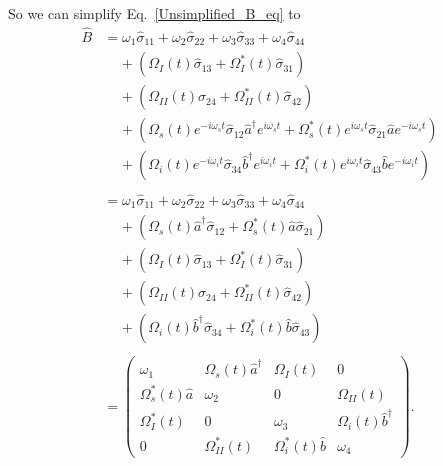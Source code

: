 \documentclass[aps,pra,showpacs,amsmath,amssymb,nofootinbib,longbibliography,superscriptaddress
]{revtex4-1}
\theoremstyle{definition}
\theoremstyle{remark}
\newcommand{\0}{\hat{0}}
\begin{document}
So we can simplify Eq.~\eqref{Unsimplified_B_eq} to
\begin{align}
    \hat{B}
    &=
    \omega_1 \hat{\sigma}_{11} + \omega_2 \hat{\sigma}_{22} + \omega_3 \hat{\sigma}_{33} + \omega_4 \hat{\sigma}_{44} \nonumber \\
    &\;\;\;\;+
    \left(
        \Omega_{I}(t) \hat{\sigma}_{13} +
        \Omega_{I}^*(t) \hat{\sigma}_{31}
    \right)\nonumber \\
    &\;\;\;\;+
    \left(
        \Omega_{II}(t) \hat{\sigma}_{24} +
        \Omega_{II}^*(t) \hat{\sigma}_{42}
    \right) \nonumber \\
    &\;\;\;\;+
    \left(
        \Omega_{s}(t) e^{-i \omega_s t} \hat{\sigma}_{12} \hat{a}^{\dagger} e^{i \omega_s t} +
        \Omega_{s}^*(t) e^{i \omega_s t} \hat{\sigma}_{21} \hat{a} e^{-i \omega_s t}
    \right) \nonumber \\
    &\;\;\;\;+
    \left(
        \Omega_{i}(t) e^{-i\omega_i t} \hat{\sigma}_{34} \hat{b}^{\dagger} e^{i \omega_i t}
        + \Omega_{i}^*(t) e^{i\omega_i t} \hat{\sigma}_{43} \hat{b} e^{-i \omega_i t}
    \right)\nonumber \\ \nonumber \\ 
    &=
    \omega_1 \hat{\sigma}_{11} + \omega_2 \hat{\sigma}_{22} + \omega_3 \hat{\sigma}_{33} + \omega_4 \hat{\sigma}_{44} \nonumber \\
    &\;\;\;\;+
    \left(
        \Omega_{s}(t) \hat{a}^{\dagger} \hat{\sigma}_{12} +
        \Omega_{s}^*(t) \hat{a} \hat{\sigma}_{21}
    \right) \nonumber \\
    &\;\;\;\;+
    \left(
        \Omega_{I}(t) \hat{\sigma}_{13} +
        \Omega_{I}^*(t) \hat{\sigma}_{31}
    \right)\nonumber \\
    &\;\;\;\;+
    \left(
        \Omega_{II}(t) \hat{\sigma}_{24} +
        \Omega_{II}^*(t) \hat{\sigma}_{42}
    \right)\nonumber \\
    &\;\;\;\;+
    \left(
        \Omega_{i}(t) \hat{b}^{\dagger} \hat{\sigma}_{34} +
        \Omega_{i}^*(t) \hat{b} \hat{\sigma}_{43}
    \right) \nonumber \\ \nonumber \\ 
    &= \left(\begin{array}{cccc}
        \omega_1  & \Omega_{s}(t) \hat{a}^{\dagger} & \Omega_{I}(t) & 0\\
        \Omega_{s}^*(t) \hat{a} & \omega_2 & 0 & \Omega_{II}(t)\\
        \Omega_{I}^*(t) & 0 & \omega_3 & \Omega_{i}(t) \hat{b}^{\dagger}\\
        0 & \Omega_{II}^*(t) & \Omega_{i}^*(t) \hat{b} & \omega_4
    \end{array}\right).
\end{align}
\end{document}
